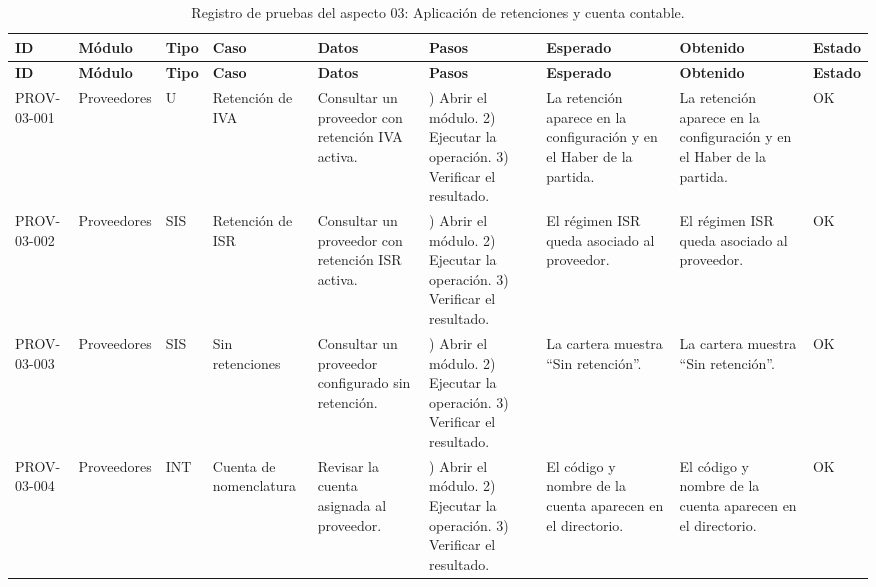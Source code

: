 \begingroup\fontsize{8}{10}\selectfont\renewcommand{\arraystretch}{1.25}\setlength{\tabcolsep}{2pt}
\begin{xltabular}{\linewidth}{@{}
>{\raggedright\arraybackslash}p{1.35cm}
>{\raggedright\arraybackslash}p{1.25cm}
>{\centering\arraybackslash}p{0.90cm}
>{\raggedright\arraybackslash}p{1.75cm}
>{\raggedright\arraybackslash}p{1.90cm}
>{\raggedright\arraybackslash}p{2.10cm}
>{\raggedright\arraybackslash}p{2.05cm}
>{\raggedright\arraybackslash}p{2.05cm}
>{\centering\arraybackslash}p{0.95cm}
@{}}

\caption{Registro de pruebas del aspecto 03: Aplicación de retenciones y cuenta contable.}\label{tab:cap4_aspecto_prov_03}\\
\toprule
\textbf{ID} & \textbf{Módulo} & \textbf{Tipo} & \textbf{Caso} & \textbf{Datos} & \textbf{Pasos} & \textbf{Esperado} & \textbf{Obtenido} & \textbf{Estado}\\
\midrule
\endfirsthead
\toprule
\textbf{ID} & \textbf{Módulo} & \textbf{Tipo} & \textbf{Caso} & \textbf{Datos} & \textbf{Pasos} & \textbf{Esperado} & \textbf{Obtenido} & \textbf{Estado}\\
\midrule
\endhead
\endfoot
\bottomrule
\endlastfoot
PROV-03-001 & Proveedores & U & Retención de IVA & Consultar un proveedor con retención IVA activa. & 1) Abrir el módulo. 2) Ejecutar la operación. 3) Verificar el resultado. & La retención aparece en la configuración y en el Haber de la partida. & La retención aparece en la configuración y en el Haber de la partida. & OK\\
\addlinespace
PROV-03-002 & Proveedores & SIS & Retención de ISR & Consultar un proveedor con retención ISR activa. & 1) Abrir el módulo. 2) Ejecutar la operación. 3) Verificar el resultado. & El régimen ISR queda asociado al proveedor. & El régimen ISR queda asociado al proveedor. & OK\\
\addlinespace
PROV-03-003 & Proveedores & SIS & Sin retenciones & Consultar un proveedor configurado sin retención. & 1) Abrir el módulo. 2) Ejecutar la operación. 3) Verificar el resultado. & La cartera muestra “Sin retención”. & La cartera muestra “Sin retención”. & OK\\
\addlinespace
PROV-03-004 & Proveedores & INT & Cuenta de nomenclatura & Revisar la cuenta asignada al proveedor. & 1) Abrir el módulo. 2) Ejecutar la operación. 3) Verificar el resultado. & El código y nombre de la cuenta aparecen en el directorio. & El código y nombre de la cuenta aparecen en el directorio. & OK\\

\end{xltabular}
